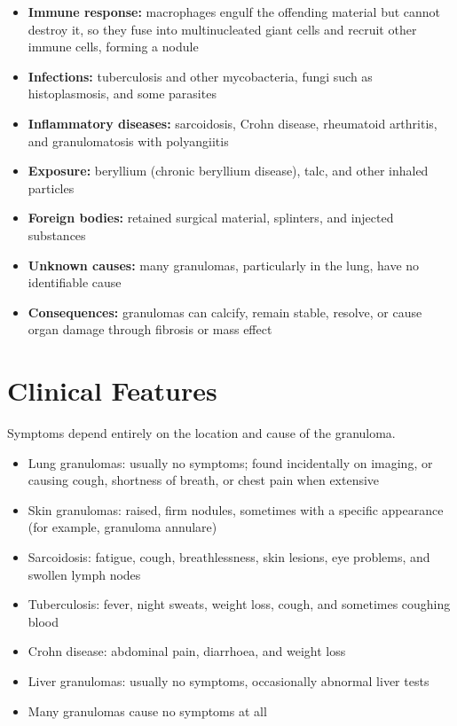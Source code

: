 \begin{itemize}
    \item \textbf{Immune response:} macrophages engulf the offending material but cannot destroy it, so they fuse into multinucleated giant cells and recruit other immune cells, forming a nodule
    \item \textbf{Infections:} tuberculosis and other mycobacteria, fungi such as histoplasmosis, and some parasites
    \item \textbf{Inflammatory diseases:} sarcoidosis, Crohn disease, rheumatoid arthritis, and granulomatosis with polyangiitis
    \item \textbf{Exposure:} beryllium (chronic beryllium disease), talc, and other inhaled particles
    \item \textbf{Foreign bodies:} retained surgical material, splinters, and injected substances
    \item \textbf{Unknown causes:} many granulomas, particularly in the lung, have no identifiable cause
    \item \textbf{Consequences:} granulomas can calcify, remain stable, resolve, or cause organ damage through fibrosis or mass effect
\end{itemize}

\section*{Clinical Features}
Symptoms depend entirely on the location and cause of the granuloma.

\begin{itemize}
    \item Lung granulomas: usually no symptoms; found incidentally on imaging, or causing cough, shortness of breath, or chest pain when extensive
    \item Skin granulomas: raised, firm nodules, sometimes with a specific appearance (for example, granuloma annulare)
    \item Sarcoidosis: fatigue, cough, breathlessness, skin lesions, eye problems, and swollen lymph nodes
    \item Tuberculosis: fever, night sweats, weight loss, cough, and sometimes coughing blood
    \item Crohn disease: abdominal pain, diarrhoea, and weight loss
    \item Liver granulomas: usually no symptoms, occasionally abnormal liver tests
    \item Many granulomas cause no symptoms at all
\end{itemize}


